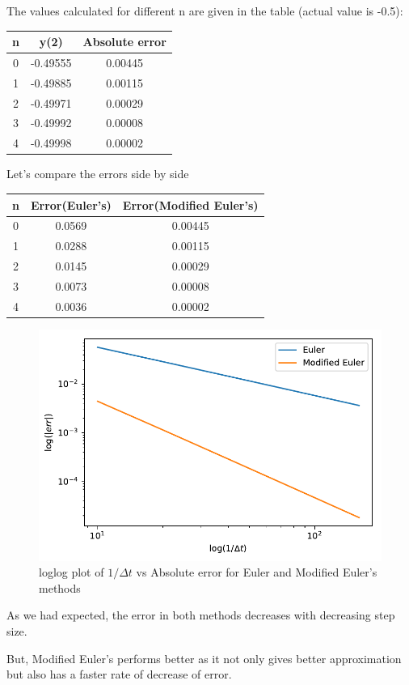 \documentclass[12pt,letterpaper]{article}
\begin{document}
The values calculated for different n are given in the table (actual value is -0.5):

\begin{center}
\begin{tabular}{c c c}
\hline
n	&		y(2)	&	Absolute error\\
\hline
0	&	-0.49555		&	0.00445\\
1	&	-0.49885		&	0.00115\\
2	&	-0.49971		&	0.00029\\
3	&	-0.49992		&	0.00008\\
4	&	-0.49998		&	0.00002\\
\hline
\end{tabular}
\end{center}

Let's compare the errors side by side

\begin{center}
\begin{tabular}{c c c}
\hline
n	&	Error(Euler's)	&	Error(Modified Euler's)\\
\hline
0	&	0.0569	&	0.00445\\
1	&	0.0288	&	0.00115\\
2	&	0.0145	&	0.00029\\
3	&	0.0073	&	0.00008\\
4	&	0.0036	&	0.00002\\
\hline
\end{tabular}
\end{center}

\begin{figure}[H]
\centering
\includegraphics{"../images/eulervsmod_euler"}
\caption{loglog plot of $1/\Delta t$ vs Absolute error for Euler and Modified Euler's methods}
\end{figure}

As we had expected, the error in both methods decreases with decreasing step size.

But, Modified Euler's performs better as it not only gives better approximation but also has a faster rate of decrease of error.
\end{document}

